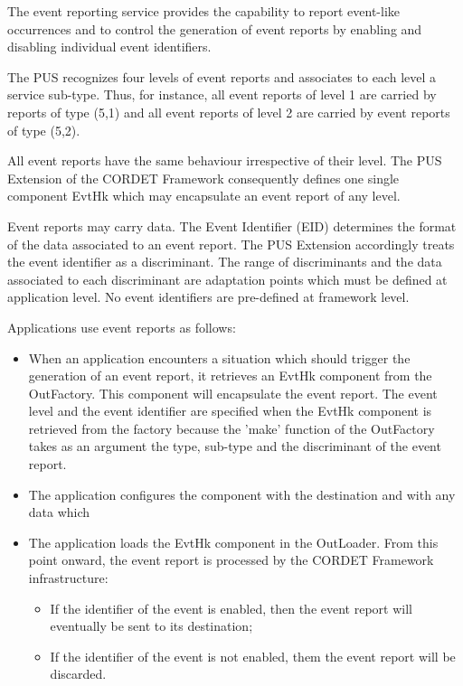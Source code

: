 \documentclass{pnp_article}
\begin{document}
The event reporting service provides the capability to report event-like occurrences and to control the generation of event reports by enabling and disabling individual event identifiers.

The PUS recognizes four levels of event reports and associates to each level a service sub-type. Thus, for instance, all event reports of level 1 are carried by reports of type (5,1) and all event reports of level 2 are carried by event reports of type (5,2). 

All event reports have the same behaviour irrespective of their level. The PUS Extension of the CORDET Framework consequently defines one single component EvtHk which may encapsulate an event report of any level.

Event reports may carry data. The Event Identifier (EID) determines the format of the data associated to an event report. The PUS Extension accordingly treats the event identifier as a discriminant. The range of discriminants and the data associated to each discriminant are adaptation points which must be defined at application level. No event identifiers are pre-defined at framework level.

Applications use event reports as follows:

\begin{itemize}
\item When an application encounters a situation which should trigger the generation of an event report, it retrieves an EvtHk component from the OutFactory. This component will encapsulate the event report. The event level and the event identifier are specified when the EvtHk component is retrieved from the factory because the 'make' function of the OutFactory takes as an argument the type, sub-type and the discriminant of the event report.
\item The application configures the component with the destination and with any data which 
\item The application loads the EvtHk component in the OutLoader. From this point onward, the event report is processed by the CORDET Framework infrastructure:
	\begin{itemize}
	\item If the identifier of the event is enabled, then the event report will eventually be sent to its destination;
	\item If the identifier of the event is not enabled, them the event report will be discarded.
	\end{itemize}
\end{itemize}
\end{document}
